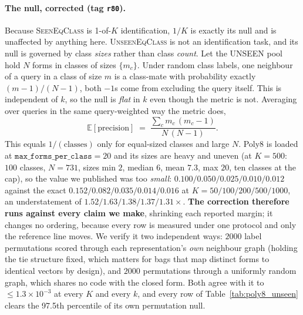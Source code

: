 \paragraph{The null, corrected (tag \texttt{r80}).} Because \textsc{SeenEqClass} is 1-of-$K$ identification, $1/K$ is exactly its null and is unaffected by anything here. \textsc{UnseenEqClass} is not an identification task, and its null is governed by class \emph{sizes} rather than class \emph{count}. Let the UNSEEN pool hold $N$ forms in classes of sizes $\{m_c\}$. Under random class labels, one neighbour of a query in a class of size $m$ is a class-mate with probability exactly $(m{-}1)/(N{-}1)$, both $-1$s come from excluding the query itself. This is independent of $k$, so the null is \emph{flat} in $k$ even though the metric is not. Averaging over queries in the same query-weighted way the metric does,
\[
\mathbb{E}[\text{precision}] \;=\; \frac{\sum_c m_c\,(m_c-1)}{N\,(N-1)}.
\]
This equals $1/(\text{classes})$ only for equal-sized classes and large $N$. Poly8 is loaded at $\texttt{max\_forms\_per\_class}{=}20$ and its sizes are heavy and uneven (at $K{=}500$: $100$ classes, $N{=}731$, sizes min $2$, median $6$, mean $7.3$, max $20$, ten classes at the cap), so the value we published was too \emph{small}: $0.100/0.050/0.025/0.010/0.012$ against the exact $0.152/0.082/0.035/0.014/0.016$ at $K{=}50/100/200/500/1000$, an understatement of $1.52/1.63/1.38/1.37/1.31\times$. \textbf{The correction therefore runs against every claim we make}, shrinking each reported margin; it changes no ordering, because every row is measured under one protocol and only the reference line moves. We verify it two independent ways: $2000$ label permutations scored through each representation's \emph{own} neighbour graph (holding the tie structure fixed, which matters for bags that map distinct forms to identical vectors by design), and $2000$ permutations through a uniformly random graph, which shares no code with the closed form. Both agree with it to ${\leq}1.3{\times}10^{-3}$ at every $K$ and every $k$, and every row of Table~\ref{tab:poly8_unseen} clears the 97.5th percentile of its own permutation null.

